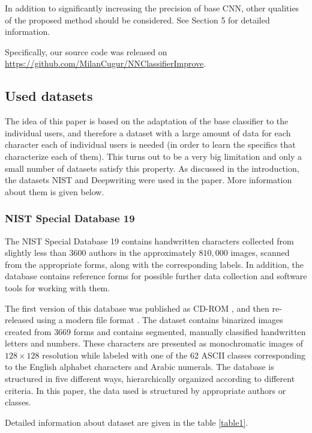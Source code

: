 \documentclass{article}
\begin{document}
In addition to significantly increasing the precision of base CNN, other qualities of the proposed method should be considered.
See Section 5 for detailed information. %

Specifically, our source code was released on \url{https://github.com/MilanCugur/NNClassifierImprove}.

\subsection{Used datasets}

The idea of this paper is based on the adaptation of the base classifier to the individual users,
and therefore a dataset with a large amount of data for each character each of individual users is needed
(in order to learn the specifics that characterize each of them).
This turns out to be a very big limitation and only a small number of datasets satisfy this property.
As discussed in the introduction, the datasets NIST and Deepwriting were used in the paper.
More information about them is given below.

\subsubsection{NIST Special Database 19}

The NIST Special Database 19 \citet{nist} contains handwritten characters collected from slightly less than $3600$ authors in the approximately $810,000$ images,
scanned from the appropriate forms, along with the corresponding labels.
In addition, the database contains reference forms for possible further data collection and software tools for working with them.

The first version of this database was published as CD-ROM \citet{nistv0}, and then re-released using a modern file format \citet{nist}.
The dataset contains binarized images created from $3669$ forms and contains segmented, manually classified handwritten letters and numbers.
These characters are presented as monochromatic images of $128 \times 128$ resolution while labeled with one of the 62 ASCII classes corresponding to the English alphabet characters and Arabic numerals.
The database is structured in five different ways, hierarchically organized according to different criteria.
In this paper, the data used is structured by appropriate authors or classes.

Detailed information about dataset are given in the table \ref{table1}.
\end{document}
